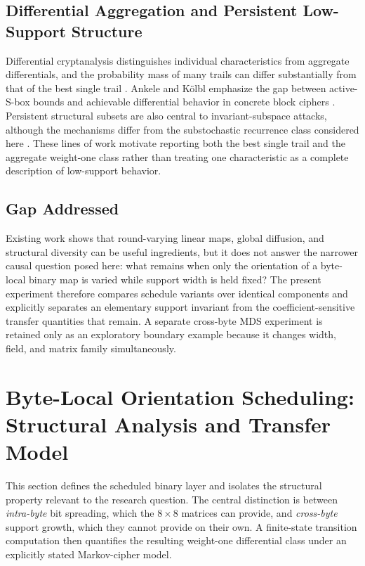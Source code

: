 \documentclass[cryptography,article,submit,oneauthor]{Definitions/mdpi}
\begin{document}
\subsection{Differential Aggregation and Persistent Low-Support Structure}\label{sec:2-5}
Differential cryptanalysis distinguishes individual characteristics from aggregate differentials, and the probability mass of many trails can differ substantially from that of the best single trail \cite{ref54,ref62}. Ankele and K\"olbl emphasize the gap between active-S-box bounds and achievable differential behavior in concrete block ciphers \cite{ref61}. Persistent structural subsets are also central to invariant-subspace attacks, although the mechanisms differ from the substochastic recurrence class considered here \cite{ref63}. These lines of work motivate reporting both the best single trail and the aggregate weight-one class rather than treating one characteristic as a complete description of low-support behavior.

\subsection{Gap Addressed}\label{sec:2-6}
Existing work shows that round-varying linear maps, global diffusion, and structural diversity can be useful ingredients, but it does not answer the narrower causal question posed here: what remains when only the orientation of a byte-local binary map is varied while support width is held fixed? The present experiment therefore compares schedule variants over identical components and explicitly separates an elementary support invariant from the coefficient-sensitive transfer quantities that remain. A separate cross-byte MDS experiment is retained only as an exploratory boundary example because it changes width, field, and matrix family simultaneously.
\section{Byte-Local Orientation Scheduling: Structural Analysis and Transfer Model}\label{sec:3}
This section defines the scheduled binary layer and isolates the structural property relevant to the research question. The central distinction is between \emph{intra-byte} bit spreading, which the $8\times8$ matrices can provide, and \emph{cross-byte} support growth, which they cannot provide on their own. A finite-state transition computation then quantifies the resulting weight-one differential class under an explicitly stated Markov-cipher model.\par
\end{document}
